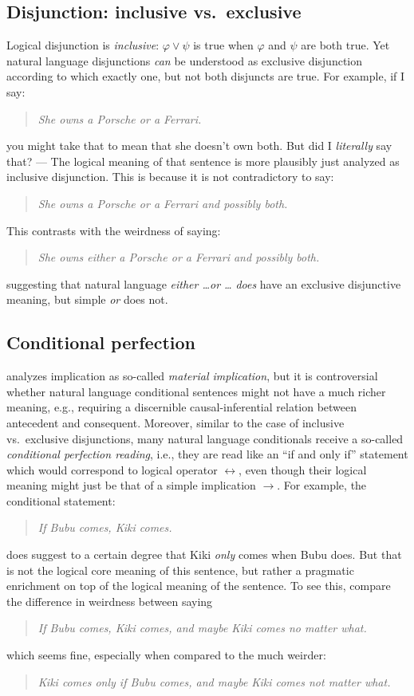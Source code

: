 \documentclass[nobib,nofonts]{tufte-handout}
\newcommand{\proplog}{\acro{PropLog}}
\begin{document}
\subsection{Disjunction: inclusive vs.~exclusive}

Logical disjunction is \emph{inclusive}: $\varphi \vee \psi$ is true when $\varphi$ and $\psi$ are both true.
Yet natural language disjunctions \emph{can} be understood as exclusive disjunction according to which exactly one, but not both disjuncts are true.
For example, if I say:
\begin{quote}
 \textit{She owns a Porsche or a Ferrari.}
\end{quote}
you might take that to mean that she doesn't own both.
But did I \emph{literally} say that?
--- The logical meaning of that sentence is more plausibly just analyzed as inclusive disjunction.
This is because it is not contradictory to say:
\begin{quote}
 \textit{She owns a Porsche or a Ferrari and possibly both.}
\end{quote}
This contrasts with the weirdness of saying:
\begin{quote}
 \textit{She owns \emph{either} a Porsche or a Ferrari and possibly both.}
\end{quote}
suggesting that natural language \emph{either \dots or \dots} \emph{does} have an exclusive disjunctive meaning, but simple \emph{or} does not.

\subsection{Conditional perfection}

\proplog analyzes implication as so-called \emph{material implication}, but it is controversial whether natural language conditional sentences might not have a much richer meaning, e.g., requiring a discernible causal-inferential relation between antecedent and consequent.
Moreover, similar to the case of inclusive vs.~exclusive disjunctions, many natural language conditionals receive a so-called \emph{conditional perfection reading}, i.e., they are read like an ``if and only if'' statement which would correspond to logical operator $\leftrightarrow$, even though their logical meaning might just be that of a simple implication $\rightarrow$.
For example, the conditional statement:
\begin{quote}
 \textit{If Bubu comes, Kiki comes.}
\end{quote}
does suggest to a certain degree that Kiki \emph{only} comes when Bubu does.
But that is not the logical core meaning of this sentence, but rather a pragmatic enrichment on top of the logical meaning of the sentence.
To see this, compare the difference in weirdness between saying
\begin{quote}
 \textit{If Bubu comes, Kiki comes, and maybe Kiki comes no matter what.}
\end{quote}
which seems fine, especially when compared to the much weirder:
\begin{quote}
 \textit{Kiki comes only if Bubu comes, and maybe Kiki comes not matter what.}
\end{quote}
\end{document}

